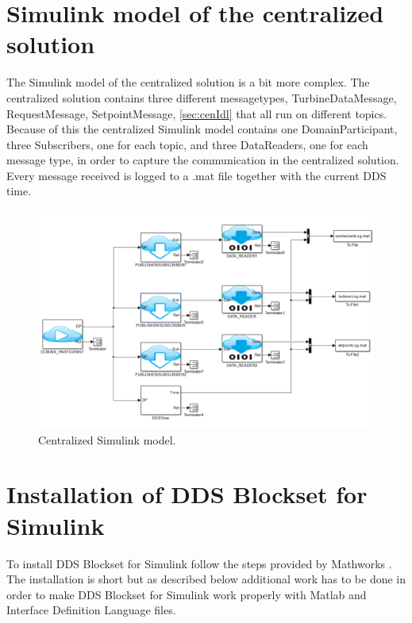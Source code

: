 \section{Simulink model of the centralized solution}\label{subsec:centralizedmodel}
The Simulink model of the centralized solution is a bit more complex. The centralized solution contains three different messagetypes, TurbineDataMessage, RequestMessage, SetpointMessage, \cref{sec:cenIdl} that all run on different topics. Because of this the centralized Simulink model contains one DomainParticipant, three Subscribers, one for each topic, and three DataReaders, one for each message type, in order to capture the communication in the centralized solution. Every message received is logged to a .mat file together with the current DDS time.

\begin{figure}[!h]
\includegraphics[width=\textwidth]{figures/CentralizedModel}
	\caption[Centralized Simulink model]{
		\label{fig:centralizedSimulinkModel} 
		\footnotesize{%
			Centralized Simulink model.
		}
	}
\end{figure}

\section{Installation of DDS Blockset for Simulink}
To install DDS Blockset for Simulink follow the steps provided by Mathworks \cite{DDSBlocksetPilotSupportPackageUserGuide}. The installation is short but as described below additional work has to be done in order to make DDS Blockset for Simulink work properly with Matlab and Interface Definition Language files.

